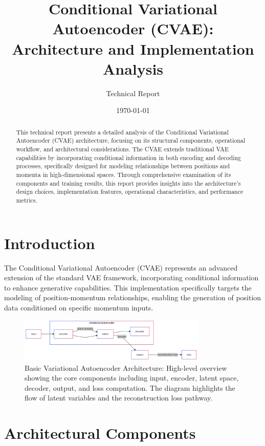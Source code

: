 \documentclass{article}
\title{\textbf{Conditional Variational Autoencoder (CVAE): \\
Architecture and Implementation Analysis}}
\author{Technical Report}
\date{\today}
\begin{document}
\maketitle

\begin{abstract}
This technical report presents a detailed analysis of the Conditional Variational Autoencoder (CVAE) architecture, focusing on its structural components, operational workflow, and architectural considerations. The CVAE extends traditional VAE capabilities by incorporating conditional information in both encoding and decoding processes, specifically designed for modeling relationships between positions and momenta in high-dimensional spaces. Through comprehensive examination of its components and training results, this report provides insights into the architecture's design choices, implementation features, operational characteristics, and performance metrics.
\end{abstract}

\tableofcontents
\newpage

\section{Introduction}
The Conditional Variational Autoencoder (CVAE) represents an advanced extension of the standard VAE framework, incorporating conditional information to enhance generative capabilities. This implementation specifically targets the modeling of position-momentum relationships, enabling the generation of position data conditioned on specific momentum inputs.

\begin{figure}[H]
    \centering
    \includegraphics[width=0.8\textwidth]{1.png}
    \caption{Basic Variational Autoencoder Architecture: High-level overview showing the core components including input, encoder, latent space, decoder, output, and loss computation. The diagram highlights the flow of latent variables and the reconstruction loss pathway.}
    \label{fig:architecture}
\end{figure}

\section{Architectural Components}
\end{document}

